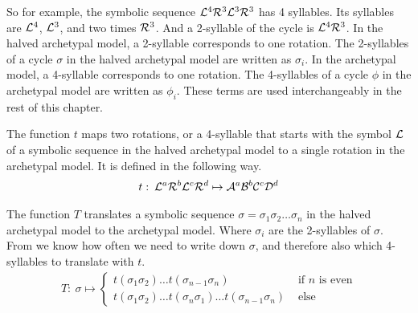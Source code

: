 So for example, the symbolic sequence $\mathcal{L}^4\mathcal{R}^3\mathcal{L}^3\mathcal{R}^3$ has 4 syllables.
Its syllables are $\mathcal{L}^4$, $\mathcal{L}^3$, and two times $\mathcal{R}^3$.
And a 2-syllable of the cycle is $\mathcal{L}^4\mathcal{R}^3$.
In the halved archetypal model, a 2-syllable corresponds to one rotation.
The 2-syllables of a cycle $\sigma$ in the halved archetypal model are written as $\sigma_i$.
In the archetypal model, a 4-syllable corresponds to one rotation.
The 4-syllables of a cycle $\phi$ in the archetypal model are written as $\phi_i$.
These terms are used interchangeably in the rest of this chapter.

\begin{definition}
	\label{def:t}
	The function $t$ maps two rotations, or a 4-syllable that starts with the symbol $\mathcal{L}$ of a symbolic sequence in the halved archetypal model to a single rotation in the archetypal model.
	It is defined in the following way.
	\begin{align}
		t:\: \mathcal{L}^a\mathcal{R}^b\mathcal{L}^c\mathcal{R}^d \mapsto \mathcal{A}^a\mathcal{B}^b\mathcal{C}^c\mathcal{D}^d
	\end{align}
\end{definition}

\begin{definition}
	\label{def:T}
	The function $T$ translates a symbolic sequence $\sigma = \sigma_1\sigma_2 \dots \sigma_n$ in the halved archetypal model to the archetypal model.
	Where $\sigma_i$ are the 2-syllables of $\sigma$.
	From  we know how often we need to write down $\sigma$, and therefore also which 4-syllables to translate with $t$.
	\begin{align}
		T:\: \sigma \mapsto \begin{cases}
			                    t(\sigma_1\sigma_2) \dots t(\sigma_{n-1}\sigma_n)                           & \text{ if $n$ is even} \\
			                    t(\sigma_1\sigma_2) \dots t(\sigma_n\sigma_1) \dots t(\sigma_{n-1}\sigma_n) & \text{ else}
		                    \end{cases}
	\end{align}
\end{definition}

